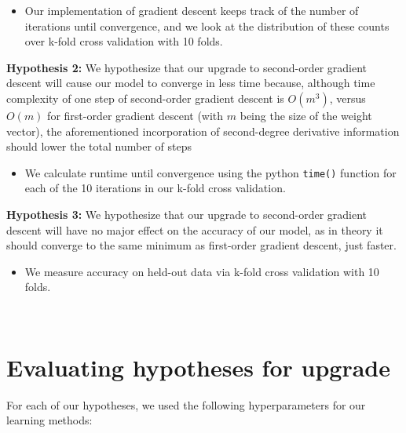 \documentclass[11pt]{extarticle}
\begin{document}
\begin{itemize}
\item Our implementation of gradient descent keeps track of the number of iterations until convergence, and we look at the distribution of these counts over k-fold cross validation with 10 folds.
\end{itemize}

\textbf{Hypothesis 2:} We hypothesize that our upgrade to second-order gradient descent will cause our model to converge in less time because, although time complexity of one step of second-order gradient descent is $O(m^3)$, versus $O(m)$ for first-order gradient descent (with $m$ being the size of the weight vector), the aforementioned incorporation of second-degree derivative information should lower the total number of steps 

\begin{itemize}
\item We calculate runtime until convergence using the python \texttt{time()} function for each of the 10 iterations in our k-fold cross validation.
\end{itemize}

\textbf{Hypothesis 3:} We hypothesize that our upgrade to second-order gradient descent will have no major effect on the accuracy of our model, as in theory it should converge to the same minimum as first-order gradient descent, just faster.

\begin{itemize}
\item We measure accuracy on held-out data via k-fold cross validation with 10 folds.
\end{itemize}

~~\\


\newpage

\section{Evaluating hypotheses for upgrade}

For each of our hypotheses, we used the following hyperparameters for our learning methods:
\end{document}
